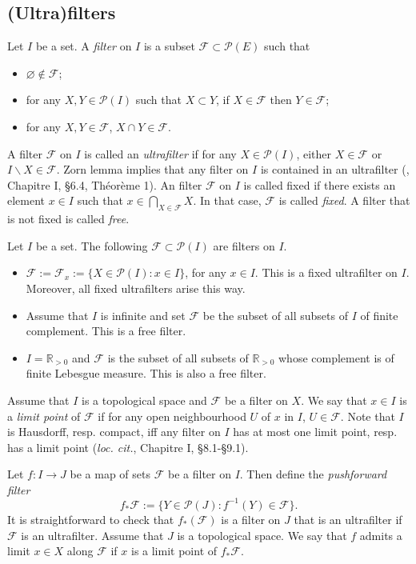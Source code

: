 \documentclass [11pt,reqno]{amsart}
\def\bR{{\mathbb{R}}}
\newcommand{\1}{\mathmybb{1}}
\def\cF{{\mathcal{F}}}
\def\cP{{\mathcal{P}}}
\def\setminus{\smallsetminus}
\def\emptyset{\varnothing}
\begin{document}
\subsection{(Ultra)filters}
\label{sub:filters}


Let $I$ be a set. A \emph{filter} on $I$ is a subset $\cF \subset \cP(E)$ such that 
\begin{itemize}
	\item[(i)] $\emptyset \notin \cF$;
	\item[(ii)] for any $X,Y\in \cP(I)$ such that $X\subset Y$, if $X\in \cF$ then $Y\in \cF$;
	\item[(iii)] for any $X,Y\in \cF$, $X\cap Y\in \cF$. 
\end{itemize}
A filter $\cF$ on $I$ is called an \emph{ultrafilter} if for any $X\in \cP(I)$, either $X\in \cF$ or $I\setminus X \in \cF$. Zorn lemma implies that any filter on $I$ is contained in an ultrafilter (\cite{BouTG}, Chapitre I, \S 6.4, Théorème 1). An filter $\cF$ on $I$ is called fixed if there exists an element $x\in I$ such that $x\in \bigcap_{X\in\cF} X$. In that case, $\cF$ is called \emph{fixed}. A filter that is not fixed is called \emph{free}. 

\begin{example}
\label{example:filters}
Let $I$ be a set. The following $\cF \subset \cP(I)$ are filters on $I$.
\begin{itemize}
\item[(1)] $\cF:=\cF_{x}:=\{X\in\cP(I) : x\in I\}$, for any $x\in I$. This is a fixed ultrafilter on $I$. Moreover, all fixed ultrafilters arise this way. %
\item[(2)] Assume that $I$ is infinite and set $\cF$ be the subset of all subsets of $I$ of finite complement. This is a free filter.
\item[(3)] $I=\bR_{>0}$ and $\cF$ is the subset of all subsets of $\bR_{>0}$ whose complement is of finite Lebesgue measure. This is also a free filter. 
\end{itemize}
\end{example}

Assume that $I$ is a topological space and $\cF$ be a filter on $X$. We say that $x\in I$ is a \emph{limit point} of $\cF$ if for any open neighbourhood $U$ of $x$ in $I$, $U\in \cF$. Note that $I$ is Hausdorff, resp. compact, iff any filter on $I$ has at most one limit point, resp. has a limit point (\emph{loc. cit.}, Chapitre I, \S 8.1-\S 9.1). 

Let $f:I\to J$ be a map of sets $\cF$ be a filter on $I$. Then define the \emph{pushforward filter} 
$$f_{\ast}\cF := \{Y\in \cP(J) : f^{-1}(Y)\in \cF\}.$$
It is straightforward to check that $f_{\ast}(\cF)$ is a filter on $J$ that is an ultrafilter if $\cF$ is an ultrafilter. Assume that $J$ is a topological space. We say that $f$ admits a limit $x\in X$ along $\cF$ if $x$ is a limit point of $f_{\ast}\cF$. 
\end{document}
